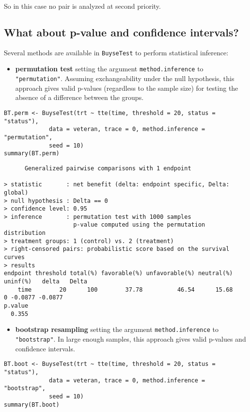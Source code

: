 \documentclass[12pt]{article}
\begin{document}
So in this case no pair is analyzed at second priority.

\clearpage

\subsection{What about p-value and confidence intervals?}
\label{sec:org7550ec6}

Several methods are available in \texttt{BuyseTest} to perform statistical inference:
\begin{itemize}
\item \textbf{permutation test} setting the argument \texttt{method.inference} to
\texttt{"permutation"}. Assuming exchangeability under the null hypothesis,
this approach gives valid p-values (regardless to the sample size)
for testing the absence of a difference between the groups.
\end{itemize}
\lstset{language=r,label= ,caption= ,captionpos=b,numbers=none}
\begin{lstlisting}
BT.perm <- BuyseTest(trt ~ tte(time, threshold = 20, status = "status"),
		     data = veteran, trace = 0, method.inference = "permutation",
		     seed = 10) 
summary(BT.perm)
\end{lstlisting}

\begin{verbatim}
      Generalized pairwise comparisons with 1 endpoint

> statistic       : net benefit (delta: endpoint specific, Delta: global) 
> null hypothesis : Delta == 0 
> confidence level: 0.95 
> inference       : permutation test with 1000 samples 
                    p-value computed using the permutation distribution 
> treatment groups: 1 (control) vs. 2 (treatment) 
> right-censored pairs: probabilistic score based on the survival curves
> results
endpoint threshold total(%) favorable(%) unfavorable(%) neutral(%) uninf(%)   delta   Delta
    time        20      100        37.78          46.54      15.68        0 -0.0877 -0.0877
p.value 
  0.355
\end{verbatim}

\begin{itemize}
\item \textbf{bootstrap resampling} setting the argument \texttt{method.inference} to
\texttt{"bootstrap"}. In large enough samples, this approach gives valid
p-values and confidence intervals.
\end{itemize}

\lstset{language=r,label= ,caption= ,captionpos=b,numbers=none}
\begin{lstlisting}
BT.boot <- BuyseTest(trt ~ tte(time, threshold = 20, status = "status"),
		     data = veteran, trace = 0, method.inference = "bootstrap",
		     seed = 10) 
summary(BT.boot)
\end{lstlisting}
\end{document}
